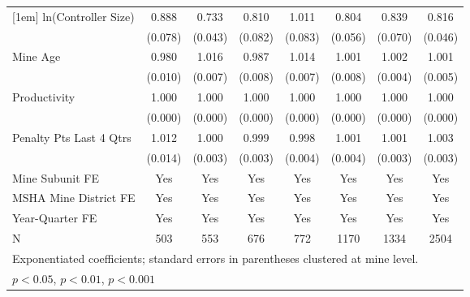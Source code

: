 {\begin{tabular}{l*{7}{c}}
[1em]
ln(Controller Size)      &       0.888         &       0.733\sym{***}&       0.810\sym{*}  &       1.011         &       0.804\sym{**} &       0.839\sym{*}  &       0.816\sym{***}\\
                         &     (0.078)         &     (0.043)         &     (0.082)         &     (0.083)         &     (0.056)         &     (0.070)         &     (0.046)         \\
[1em]
Mine Age                 &       0.980         &       1.016\sym{*}  &       0.987         &       1.014         &       1.001         &       1.002         &       1.001         \\
                         &     (0.010)         &     (0.007)         &     (0.008)         &     (0.007)         &     (0.008)         &     (0.004)         &     (0.005)         \\
[1em]
Productivity             &       1.000         &       1.000         &       1.000\sym{**} &       1.000         &       1.000         &       1.000         &       1.000         \\
                         &     (0.000)         &     (0.000)         &     (0.000)         &     (0.000)         &     (0.000)         &     (0.000)         &     (0.000)         \\
[1em]
Penalty Pts Last 4 Qtrs  &       1.012         &       1.000         &       0.999         &       0.998         &       1.001         &       1.001         &       1.003         \\
                         &     (0.014)         &     (0.003)         &     (0.003)         &     (0.004)         &     (0.004)         &     (0.003)         &     (0.003)         \\
[1em]
Mine Subunit FE          &         Yes         &         Yes         &         Yes         &         Yes         &         Yes         &         Yes         &         Yes         \\
[1em]
MSHA Mine District FE    &         Yes         &         Yes         &         Yes         &         Yes         &         Yes         &         Yes         &         Yes         \\
[1em]
Year-Quarter FE          &         Yes         &         Yes         &         Yes         &         Yes         &         Yes         &         Yes         &         Yes         \\
\hline
N                        &         503         &         553         &         676         &         772         &        1170         &        1334         &        2504         \\
\hline\hline
\multicolumn{8}{l}{\footnotesize Exponentiated coefficients; standard errors in parentheses clustered at mine level.}\\
\multicolumn{8}{l}{\footnotesize \sym{*} \(p<0.05\), \sym{**} \(p<0.01\), \sym{***} \(p<0.001\)}\\
\end{tabular}
}
